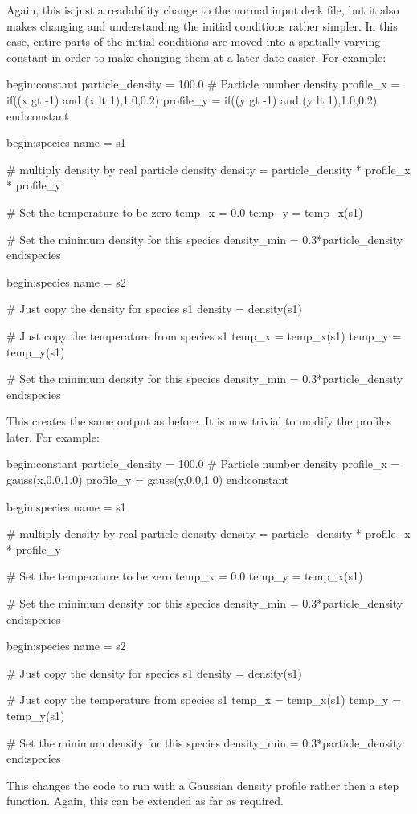 Again, this is just a readability change to the normal input.deck file, but it
also makes changing and understanding the initial conditions rather
simpler. In this case, entire parts of the initial conditions are moved into a
spatially varying constant in order to make changing them at a later date
easier. For example:
\begin{boxverbatim}
begin:constant
   particle_density = 100.0 # Particle number density
   profile_x = if((x gt -1) and (x lt 1),1.0,0.2)
   profile_y = if((y gt -1) and (y lt 1),1.0,0.2)
end:constant

begin:species
   name = s1

   # multiply density by real particle density
   density = particle_density * profile_x * profile_y

   # Set the temperature to be zero
   temp_x = 0.0
   temp_y = temp_x(s1)

   # Set the minimum density for this species
   density_min = 0.3*particle_density
end:species

begin:species
   name = s2

   # Just copy the density for species s1
   density = density(s1)

   # Just copy the temperature from species s1
   temp_x = temp_x(s1)
   temp_y = temp_y(s1)

   # Set the minimum density for this species
   density_min = 0.3*particle_density
end:species
\end{boxverbatim}

This creates the same output as before. It is now trivial to modify the
profiles later. For example:
\begin{boxverbatim}
begin:constant
   particle_density = 100.0 # Particle number density
   profile_x = gauss(x,0.0,1.0)
   profile_y = gauss(y,0.0,1.0)
end:constant

begin:species
   name = s1

   # multiply density by real particle density
   density = particle_density * profile_x * profile_y

   # Set the temperature to be zero
   temp_x = 0.0
   temp_y = temp_x(s1)

   # Set the minimum density for this species
   density_min = 0.3*particle_density
end:species

begin:species
   name = s2

   # Just copy the density for species s1
   density = density(s1)

   # Just copy the temperature from species s1
   temp_x = temp_x(s1)
   temp_y = temp_y(s1)

   # Set the minimum density for this species
   density_min = 0.3*particle_density
end:species
\end{boxverbatim}

This changes the code to run with a Gaussian density profile rather then a step
function. Again, this can be extended as far as required.




